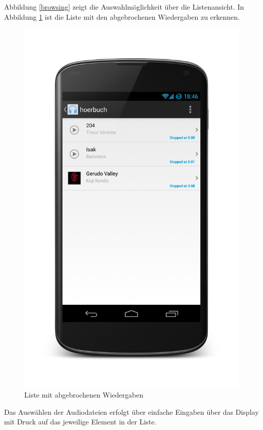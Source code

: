 Abbildung \ref{browsing} zeigt die Auswahlmöglichkeit über die Listenansicht. In Abbildung \ref{broken} ist die Liste mit den abgebrochenen Wiedergaben zu erkennen.

\begin{figure}[h!t]
\begin{center}
\includegraphics[scale=.2]{images/broken}
\caption{Liste mit abgebrochenen Wiedergaben}
\label{broken}
\end{center}
\end{figure}

Das Auswählen der Audiodateien erfolgt über einfache Eingaben über das Display mit Druck auf das jeweilige Element in der Liste.

